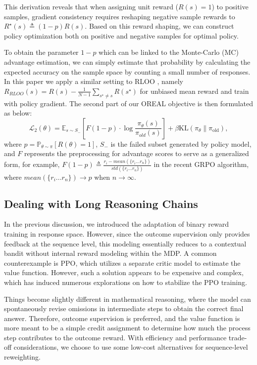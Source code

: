 This derivation reveals that when assigning unit reward ($R(s)=1$) to positive samples, gradient consistency requires reshaping negative sample rewards to $R^\star(s) \triangleq (1-p)R(s)$. Based on this reward shaping, we can construct policy optimization both on positive and negative samples for optimal policy. 
 
 
To obtain the parameter $1-p$ which can be linked to the Monte-Carlo (MC) advantage estimation, we can simply estimate that probability by calculating the expected accuracy on the sample space by counting a small number of responses.
In this paper we apply a similar setting to RLOO \cite{fukunaga1989leave}, namely $R_{RLOO}(s) = R(s) - \frac{1}{N-1} \sum_{s^\star \neq s} R(s^\star)$ for unbiased mean reward
and train with policy gradient. The second part of our OREAL objective is then formulated as below:
\[
\mathcal{L}_{2}(\theta) = \mathbb{E}_{s \sim S_-} \left[  F(1-p) \cdot\log \frac{\pi_\theta(s)}{\pi_{old}(s)} \right]  + \beta \text{KL}(\pi_\theta \parallel \pi_{\text{old}}),
\]
where $p = \mathbb{P}_{\theta \sim \pi}[R(\theta) = 1]$, $S_-$ is the failed subset generated by policy model, and $F$ represents the preprocessing for advantage scores to serve as a generalized form, for example, $F(1-p) \triangleq \frac{r_i-mean(\{r_i...r_n\})}{std(\{r_i...r_n\})}$ in the recent GRPO \cite{shao2024deepseekmath} algorithm, where $mean(\{r_i...r_n\}) \to p$ when $n \to \infty$. 


\subsection{Dealing with Long Reasoning Chains}\label{subsec:tokenlevel_rm}
In the previous discussion, we introduced the adaptation of binary reward training in response space. However, since the outcome supervision only provides feedback at the sequence level, this modeling essentially reduces to a contextual bandit without internal reward modeling within the MDP. A common counterexample is PPO, which utilizes a separate critic model to estimate the value function. However, such a solution appears to be expensive and complex, which has induced numerous explorations on how to stabilize the PPO training. 

Things become slightly different in mathematical reasoning, where the model can spontaneously revise omissions in intermediate steps to obtain the correct final answer. Therefore, outcome supervision is preferred, and the value function is more meant to be a simple credit assignment to determine how much the process step contributes to the outcome reward. With efficiency and performance trade-off considerations, we choose to use some low-cost alternatives for sequence-level reweighting.


